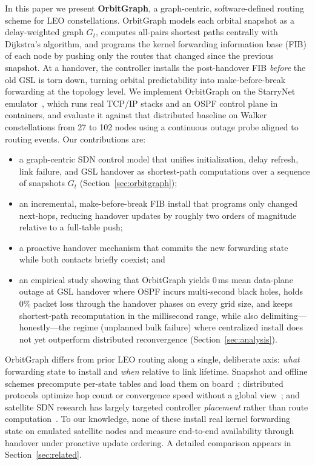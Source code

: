 In this paper we present \textbf{OrbitGraph}, a graph-centric, software-defined
routing scheme for LEO constellations.
OrbitGraph models each orbital snapshot as a delay-weighted graph $G_t$, computes
all-pairs shortest paths centrally with Dijkstra's algorithm, and programs the
kernel forwarding information base (FIB) of each node by pushing only the routes
that changed since the previous snapshot.
At a handover, the controller installs the post-handover FIB \emph{before} the
old GSL is torn down, turning orbital predictability into make-before-break
forwarding at the topology level.
We implement OrbitGraph on the StarryNet emulator~\cite{lai2023starrynet}, which
runs real TCP/IP stacks and an OSPF control plane in containers, and evaluate it
against that distributed baseline on Walker constellations from 27 to 102 nodes
using a continuous outage probe aligned to routing events.
Our contributions are:
\begin{itemize}
  \item a graph-centric SDN control model that unifies initialization, delay
        refresh, link failure, and GSL handover as shortest-path computations
        over a sequence of snapshots $G_t$ (Section~\ref{sec:orbitgraph});
  \item an incremental, make-before-break FIB install that programs only changed
        next-hops, reducing handover updates by roughly two orders of magnitude
        relative to a full-table push;
  \item a proactive handover mechanism that commits the new forwarding state
        while both contacts briefly coexist; and
  \item an empirical study showing that OrbitGraph yields \mbox{0\,ms} mean
        data-plane outage at GSL handover where OSPF incurs multi-second black
        holes, holds 0\% packet loss through the handover phases on every grid
        size, and keeps shortest-path recomputation in the millisecond range,
        while also delimiting---honestly---the regime (unplanned bulk failure)
        where centralized install does not yet outperform distributed
        reconvergence (Section~\ref{sec:analysis}).
\end{itemize}

OrbitGraph differs from prior LEO routing along a single, deliberate axis:
\emph{what} forwarding state to install and \emph{when} relative to link
lifetime.
Snapshot and offline schemes precompute per-state tables and load them on
board~\cite{seong:topological-design:1995}; distributed protocols optimize hop
count or convergence speed without a global view~\cite{gregory:satellite-routing:2022,
pam:opspf:2019}; and satellite SDN research has largely targeted controller
\emph{placement} rather than route computation~\cite{papa:sdn-cpp:2018,
guo:spda:2022}.
To our knowledge, none of these install real kernel forwarding state on emulated
satellite nodes and measure end-to-end availability through handover under
proactive update ordering.
A detailed comparison appears in Section~\ref{sec:related}.

